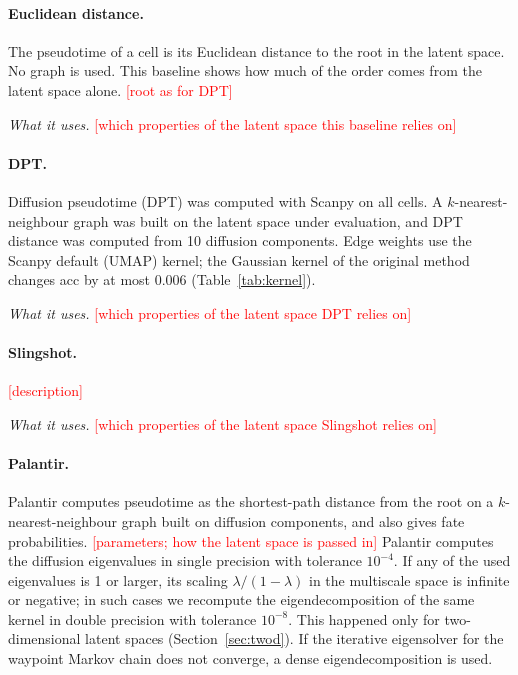 \documentclass[10pt,a4paper,twocolumn]{article}
\newcommand{\todo}[1]{\textcolor{red}{[#1]}}
\begin{document}
\paragraph{Euclidean distance.}
The pseudotime of a cell is its Euclidean distance to the root in the latent space. No graph is
used. This baseline shows how much of the order comes from the latent space alone.
\todo{root as for DPT}

\emph{What it uses.} \todo{which properties of the latent space this baseline relies on}

\paragraph{DPT.}
Diffusion pseudotime (DPT) \cite{haghverdi2016diffusion} was computed with Scanpy on all cells.
A $k$-nearest-neighbour graph was built on the latent space under evaluation, and DPT
distance was computed from 10 diffusion components. Edge weights use the Scanpy default (UMAP)
kernel; the Gaussian kernel of the original method changes acc by at most 0.006
(Table~\ref{tab:kernel}).

\emph{What it uses.} \todo{which properties of the latent space DPT relies on}

\paragraph{Slingshot.}
\todo{description}

\emph{What it uses.} \todo{which properties of the latent space Slingshot relies on}

\paragraph{Palantir.}
Palantir \cite{setty2019palantir} computes pseudotime as the shortest-path distance from the root
on a $k$-nearest-neighbour graph built on diffusion components, and also gives fate probabilities.
\todo{parameters; how the latent space is passed in}
Palantir computes the diffusion eigenvalues in single precision with tolerance $10^{-4}$. If any of
the used eigenvalues is 1 or larger, its scaling $\lambda/(1-\lambda)$ in the multiscale space is
infinite or negative; in such cases we recompute the eigendecomposition of the same kernel in double
precision with tolerance $10^{-8}$. This happened only for two-dimensional latent spaces
(Section~\ref{sec:twod}). If the iterative eigensolver for the waypoint Markov chain does not
converge, a dense eigendecomposition is used.
\end{document}
